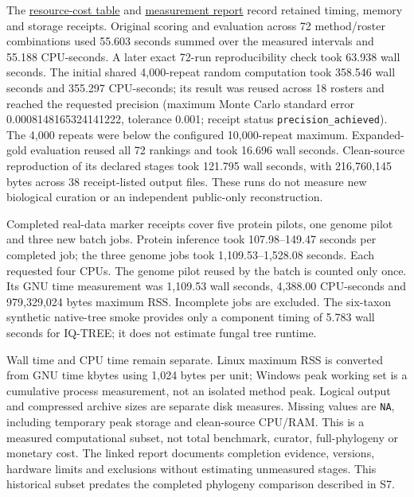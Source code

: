 \documentclass[
  10pt,
  a4paper,
]{article}
\begin{document}
The \href{https://github.com/vinvomero/fungallink-benchmark/blob/main/manuscript/resource-costs-2026-10-07.tsv}{resource-cost table} and \href{https://github.com/vinvomero/fungallink-benchmark/blob/main/manuscript/resource-costs-2026-10-07.md}{measurement report} record retained timing, memory and storage receipts. Original scoring and evaluation across 72 method/roster combinations used 55.603 seconds summed over the measured intervals and 55.188 CPU-seconds. A later exact 72-run reproducibility check took 63.938 wall seconds. The initial shared 4,000-repeat random computation took 358.546 wall seconds and 355.297 CPU-seconds; its result was reused across 18 rosters and reached the requested precision (maximum Monte Carlo standard error 0.0008148165324141222, tolerance 0.001; receipt status \texttt{precision\_achieved}). The 4,000 repeats were below the configured 10,000-repeat maximum. Expanded-gold evaluation reused all 72 rankings and took 16.696 wall seconds. Clean-source reproduction of its declared stages took 121.795 wall seconds, with 216,760,145 bytes across 38 receipt-listed output files. These runs do not measure new biological curation or an independent public-only reconstruction.

Completed real-data marker receipts cover five protein pilots, one genome pilot and three new batch jobs. Protein inference took 107.98--149.47 seconds per completed job; the three genome jobs took 1,109.53--1,528.08 seconds. Each requested four CPUs. The genome pilot reused by the batch is counted only once. Its GNU time measurement was 1,109.53 wall seconds, 4,388.00 CPU-seconds and 979,329,024 bytes maximum RSS. Incomplete jobs are excluded. The six-taxon synthetic native-tree smoke provides only a component timing of 5.783 wall seconds for IQ-TREE; it does not estimate fungal tree runtime.

Wall time and CPU time remain separate. Linux maximum RSS is converted from GNU time kbytes using 1,024 bytes per unit; Windows peak working set is a cumulative process measurement, not an isolated method peak. Logical output and compressed archive sizes are separate disk measures. Missing values are \texttt{NA}, including temporary peak storage and clean-source CPU/RAM. This is a measured computational subset, not total benchmark, curator, full-phylogeny or monetary cost. The linked report documents completion evidence, versions, hardware limits and exclusions without estimating unmeasured stages. This historical subset predates the completed phylogeny comparison described in S7.
\end{document}
